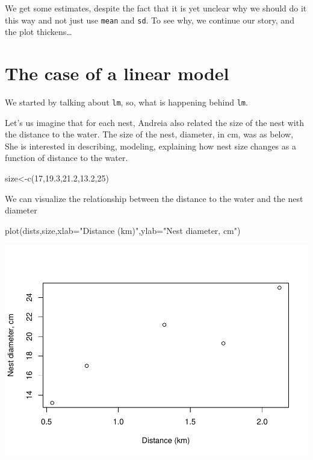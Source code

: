 \documentclass[
]{book}
\newenvironment{Shaded}{\begin{snugshade}}{\end{snugshade}}
\newcommand{\AttributeTok}[1]{\textcolor[rgb]{0.77,0.63,0.00}{#1}}
\newcommand{\DecValTok}[1]{\textcolor[rgb]{0.00,0.00,0.81}{#1}}
\newcommand{\FloatTok}[1]{\textcolor[rgb]{0.00,0.00,0.81}{#1}}
\newcommand{\FunctionTok}[1]{\textcolor[rgb]{0.00,0.00,0.00}{#1}}
\newcommand{\NormalTok}[1]{#1}
\newcommand{\OtherTok}[1]{\textcolor[rgb]{0.56,0.35,0.01}{#1}}
\newcommand{\StringTok}[1]{\textcolor[rgb]{0.31,0.60,0.02}{#1}}
\begin{document}
We get some estimates, despite the fact that it is yet unclear why we should do it this way and not just use \texttt{mean} and \texttt{sd}. To see why, we continue our story, and the plot thickens\ldots{}

\hypertarget{the-case-of-a-linear-model}{%
\section{The case of a linear model}\label{the-case-of-a-linear-model}}

We started by talking about \texttt{lm}, so, what is happening behind \texttt{lm}.

Let's us imagine that for each nest, Andreia also related the size of the nest with the distance to the water. The size of the nest, diameter, in cm, was as below, She is interested in describing, modeling, explaining how nest size changes as a function of distance to the water.

\begin{Shaded}
\begin{Highlighting}[]
\NormalTok{size}\OtherTok{\textless{}{-}}\FunctionTok{c}\NormalTok{(}\DecValTok{17}\NormalTok{,}\FloatTok{19.3}\NormalTok{,}\FloatTok{21.2}\NormalTok{,}\FloatTok{13.2}\NormalTok{,}\DecValTok{25}\NormalTok{)}
\end{Highlighting}
\end{Shaded}

We can visualize the relationship between the distance to the water and the nest diameter

\begin{Shaded}
\begin{Highlighting}[]
\FunctionTok{plot}\NormalTok{(dists,size,}\AttributeTok{xlab=}\StringTok{"Distance (km)"}\NormalTok{,}\AttributeTok{ylab=}\StringTok{"Nest diameter, cm"}\NormalTok{)}
\end{Highlighting}
\end{Shaded}

\includegraphics{ECOMODbook_files/figure-latex/ch13.26-1.pdf}
\end{document}
